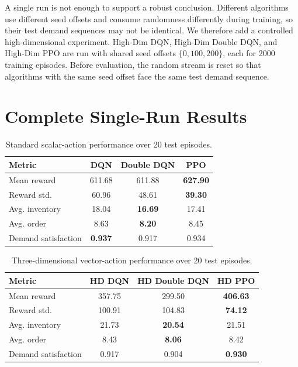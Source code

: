 \documentclass[nohyperref]{article}
\begin{document}
A single run is not enough to support a robust conclusion. Different algorithms use different seed offsets and consume randomness differently during training, so their test demand sequences may not be identical. We therefore add a controlled high-dimensional experiment. High-Dim DQN, High-Dim Double DQN, and High-Dim PPO are run with shared seed offsets $\{0,100,200\}$, each for 2000 training episodes. Before evaluation, the random stream is reset so that algorithms with the same seed offset face the same test demand sequence.

\section{Complete Single-Run Results}

\begin{table}[t]
\caption{Standard scalar-action performance over 20 test episodes.}
\label{tab:standard}
\vskip 0.15in
\begin{center}
\begin{small}
\begin{tabular}{lccc}
\toprule
Metric & DQN & Double DQN & PPO \\
\midrule
Mean reward & 611.68 & 611.88 & \textbf{627.90} \\
Reward std. & 60.96 & 48.61 & \textbf{39.30} \\
Avg. inventory & 18.04 & \textbf{16.69} & 17.41 \\
Avg. order & 8.63 & \textbf{8.20} & 8.45 \\
Demand satisfaction & \textbf{0.937} & 0.917 & 0.934 \\
\bottomrule
\end{tabular}
\end{small}
\end{center}
\vskip -0.1in
\end{table}

\begin{table}[t]
\caption{Three-dimensional vector-action performance over 20 test episodes.}
\label{tab:highdim-single}
\vskip 0.15in
\begin{center}
\begin{small}
\begin{tabular}{lccc}
\toprule
Metric & HD DQN & HD Double DQN & HD PPO \\
\midrule
Mean reward & 357.75 & 299.50 & \textbf{406.63} \\
Reward std. & 100.91 & 104.83 & \textbf{74.12} \\
Avg. inventory & 21.73 & \textbf{20.54} & 21.51 \\
Avg. order & 8.43 & \textbf{8.06} & 8.42 \\
Demand satisfaction & 0.917 & 0.904 & \textbf{0.930} \\
\bottomrule
\end{tabular}
\end{small}
\end{center}
\vskip -0.1in
\end{table}
\end{document}
